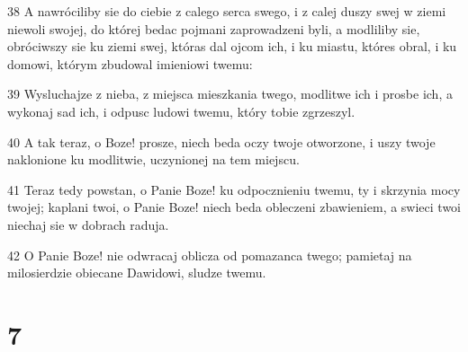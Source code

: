 \par 38 A nawróciliby sie do ciebie z calego serca swego, i z calej duszy swej w ziemi niewoli swojej, do której bedac pojmani zaprowadzeni byli, a modliliby sie, obróciwszy sie ku ziemi swej, któras dal ojcom ich, i ku miastu, któres obral, i ku domowi, którym zbudowal imieniowi twemu:
\par 39 Wysluchajze z nieba, z miejsca mieszkania twego, modlitwe ich i prosbe ich, a wykonaj sad ich, i odpusc ludowi twemu, który tobie zgrzeszyl.
\par 40 A tak teraz, o Boze! prosze, niech beda oczy twoje otworzone, i uszy twoje naklonione ku modlitwie, uczynionej na tem miejscu.
\par 41 Teraz tedy powstan, o Panie Boze! ku odpocznieniu twemu, ty i skrzynia mocy twojej; kaplani twoi, o Panie Boze! niech beda obleczeni zbawieniem, a swieci twoi niechaj sie w dobrach raduja.
\par 42 O Panie Boze! nie odwracaj oblicza od pomazanca twego; pamietaj na milosierdzie obiecane Dawidowi, sludze twemu.

\chapter{7}

